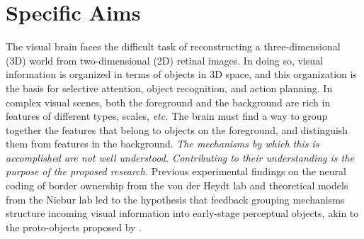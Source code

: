 \documentclass[11pt]{article}
\newcommand{\etc}[0]{{\em etc.}\xspace}
\begin{document}
%
%

\section*{Specific Aims}
The visual brain faces the difficult task of reconstructing a
three-dimensional (3D) world from two-dimensional (2D) retinal
images. In doing so, visual information is organized in terms of
objects in 3D space, and this organization is the basis for selective
attention, object recognition, and action planning. In complex visual
scenes, both the foreground and the background are rich in
    features of different types, scales, \etc
The brain must find a way to group together the features that belong
to objects on the foreground, and distinguish them from features in the background.
{\em The mechanisms by which this is accomplished are not well understood. Contributing to their understanding is the purpose of the proposed research.}
Previous experimental findings on the neural coding of border
ownership from the von der Heydt lab and theoretical models from the
Niebur lab led to the hypothesis that
feedback grouping mechanisms
structure incoming visual information into early-stage perceptual
objects,
akin to the proto-objects proposed by \citet{Rensink00a}. 
\end{document}
